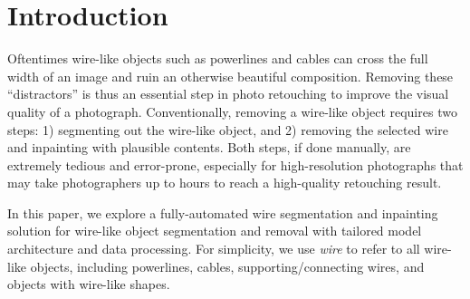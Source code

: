 
\section{Introduction}


Oftentimes wire-like objects such as powerlines and cables can cross the full width of an image and ruin an otherwise beautiful composition. Removing these ``distractors'' is thus an essential step in photo retouching to improve the visual quality of a photograph. Conventionally, removing a wire-like object requires two steps: 1) segmenting out the wire-like object, and 2) removing the selected wire and inpainting with plausible contents. Both steps, if done manually, are extremely tedious and error-prone, especially for high-resolution photographs that may take photographers up to hours to reach a high-quality retouching result.

In this paper, we explore a fully-automated wire segmentation and inpainting solution for wire-like object segmentation and removal with tailored model architecture and data processing.
For simplicity, we use \textit{wire} to refer to all wire-like objects, including powerlines, cables, supporting/connecting wires, and objects with wire-like shapes.

